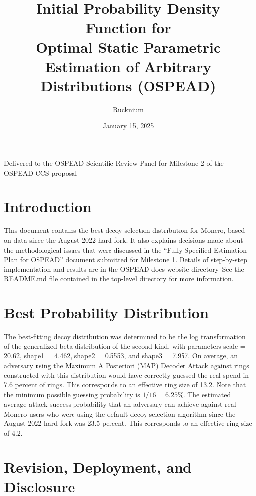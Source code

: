 \documentclass[english]{article}
\begin{document}
\title{Initial Probability Density Function for \\
Optimal Static Parametric Estimation of Arbitrary Distributions (OSPEAD)}
\author{Rucknium}
\date{January 15, 2025}
\maketitle

Delivered to the OSPEAD Scientific Review Panel for Milestone 2 of
the OSPEAD CCS proposal

\section*{Introduction}

This document contains the best decoy selection distribution for Monero,
based on data since the August 2022 hard fork. It also explains decisions
made about the methodological issues that were discussed in the ``Fully
Specified Estimation Plan for OSPEAD'' document submitted for Milestone
1. Details of step-by-step implementation and results are in the OSPEAD-docs
website directory. See the README.md file contained in the top-level
directory for more information.

\section*{Best Probability Distribution}

The best-fitting decoy distribution was determined to be the log transformation
of the generalized beta distribution of the second kind, with parameters
scale = 20.62, shape1 = 4.462, shape2 = 0.5553, and shape3 = 7.957.
On average, an adversary using the Maximum A Posteriori (MAP) Decoder
Attack against rings constructed with this distribution would have
correctly guessed the real spend in 7.6 percent of rings. This corresponds
to an effective ring size of 13.2. Note that the minimum possible
guessing probability is $1/16=6.25\%$. The estimated average attack
success probability that an adversary can achieve against real Monero
users who were using the default decoy selection algorithm since the
August 2022 hard fork was 23.5 percent. This corresponds to an effective
ring size of 4.2.

\section*{Revision, Deployment, and Disclosure}
\end{document}
